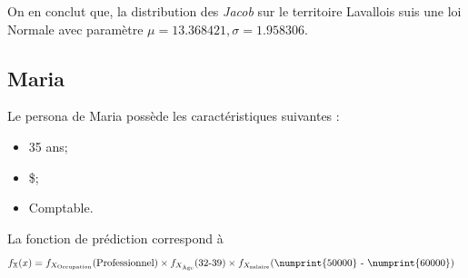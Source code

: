 \documentclass[11pt,french]{report}\usepackage[]{graphicx}\usepackage[]{color}
\begin{document}
On en conclut que, la distribution des \emph{Jacob} sur le territoire Lavallois suis une loi Normale avec paramètre $\mu = 13.368421, \sigma = 1.958306$.

\subsection*{Maria}
Le persona de Maria possède les caractéristiques suivantes : 
\begin{itemize}
\item 35 ans;
\item{} \$;
\item Comptable.
\end{itemize}
La fonction de prédiction correspond à
\begin{align*}
f_{\mathbb{X}}(x) &= f_{X_{\text{Occupation}}}(\text{Professionnel}) \times f_{X_{\text{Âge}}}(\text{32-39}) \times f_{X_{\text{salaire}}}(\text{\numprint{50000} - \numprint{60000}})
\end{align*}
\end{document}
